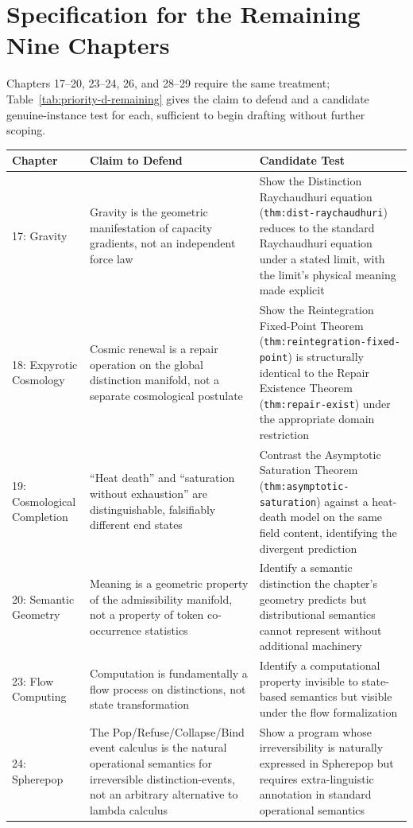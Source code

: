 \documentclass[11pt]{report}
\begin{document}
\section{Specification for the Remaining Nine Chapters}

Chapters 17--20, 23--24, 26, and 28--29 require the same
treatment; Table~\ref{tab:priority-d-remaining} gives the claim
to defend and a candidate genuine-instance test for each,
sufficient to begin drafting without further scoping.

\begin{longtable}{@{}p{3.6cm}p{6cm}p{5.3cm}@{}}
\toprule
Chapter & Claim to Defend & Candidate Test \\
\midrule
\endhead
17: Gravity & Gravity is the geometric manifestation of capacity gradients, not an independent force law & Show the Distinction Raychaudhuri equation (\texttt{thm:dist-raychaudhuri}) reduces to the standard Raychaudhuri equation under a stated limit, with the limit's physical meaning made explicit \\
18: Expyrotic Cosmology & Cosmic renewal is a repair operation on the global distinction manifold, not a separate cosmological postulate & Show the Reintegration Fixed-Point Theorem (\texttt{thm:reintegration-fixed-point}) is structurally identical to the Repair Existence Theorem (\texttt{thm:repair-exist}) under the appropriate domain restriction \\
19: Cosmological Completion & ``Heat death'' and ``saturation without exhaustion'' are distinguishable, falsifiably different end states & Contrast the Asymptotic Saturation Theorem (\texttt{thm:asymptotic-saturation}) against a heat-death model on the same field content, identifying the divergent prediction \\
20: Semantic Geometry & Meaning is a geometric property of the admissibility manifold, not a property of token co-occurrence statistics & Identify a semantic distinction the chapter's geometry predicts but distributional semantics cannot represent without additional machinery \\
23: Flow Computing & Computation is fundamentally a flow process on distinctions, not state transformation & Identify a computational property invisible to state-based semantics but visible under the flow formalization \\
24: Spherepop & The Pop/Refuse/Collapse/Bind event calculus is the natural operational semantics for irreversible distinction-events, not an arbitrary alternative to lambda calculus & Show a program whose irreversibility is naturally expressed in Spherepop but requires extra-linguistic annotation in standard operational semantics \\

\end{longtable}
\end{document}
